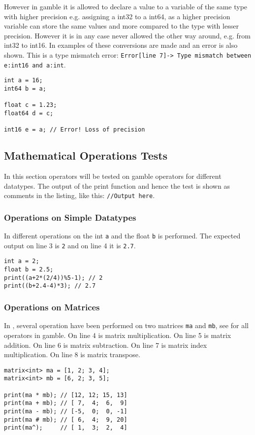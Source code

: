 However in \gls{gamble} it is allowed to declare a value to a variable of the same type with higher precision e.g. assigning a int32 to a int64, as a higher precision variable can store the same values and more compared to the type with lesser precision.
However it is in any case never allowed the other way around, e.g. from int32 to int16.
In  examples of these conversions are made and an error is also shown.
This is a type mismatch error: \texttt{Error[line    7]-> Type mismatch between e:int16 and a:int}.

\begin{lstlisting}[caption={Examples of type conversions and an error in \gls{gamble} to demonstrate the type checker.},label={lst:type3},frame=tb]
int a = 16;
int64 b = a;

float c = 1.23;
float64 d = c;

int16 e = a; // Error! Loss of precision
\end{lstlisting}

\subsection*{Mathematical Operations Tests}
In this section operators will be tested on \gls{gamble} operators for different datatypes.
The output of the print function and hence the test is shown as comments in the listing, like this: \texttt{//Output here}.

\subsubsection*{Operations on Simple Datatypes}
In  different operations on the int \texttt{a} and the float \texttt{b} is performed.
The expected output on line 3 is \texttt{2} and on line 4 it is \texttt{2.7}.
\begin{lstlisting}[caption={Example of a scope error in \gls{gamble}},label={lst:SimpleOps1},frame=tb]
int a = 2;
float b = 2.5;
print((a+2*(2/4))%5-1); // 2
print((b+2.4-4)*3); // 2.7
\end{lstlisting}

\subsubsection*{Operations on Matrices}
In , several operation have been performed on two matrices \texttt{ma} and \texttt{mb}, see  for all operators in \gls{gamble}. 
On line 4 is matrix multiplication.
On line 5 is matrix addition.
On line 6 is matrix subtraction.
On line 7 is matrix index multiplication.
On line 8 is matrix transpose.
\begin{lstlisting}[caption={Matrix multiplication in \gls{gamble}.},label={lst:matrix1},frame=tb]
matrix<int> ma = [1, 2; 3, 4];
matrix<int> mb = [6, 2; 3, 5];

print(ma * mb); // [12, 12; 15, 13]
print(ma + mb); // [ 7,  4;  6,  9]
print(ma - mb); // [-5,  0;  0, -1]
print(ma # mb); // [ 6,  4;  9, 20]
print(ma^);     // [ 1,  3;  2,  4]
\end{lstlisting}



